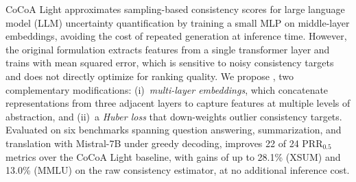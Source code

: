 CoCoA Light approximates sampling-based consistency scores for large language model
(LLM) uncertainty quantification by training a small MLP on middle-layer embeddings,
avoiding the cost of repeated generation at inference time.
However, the original formulation extracts features from a single transformer layer
and trains with mean squared error, which is sensitive to noisy consistency targets
and does not directly optimize for ranking quality.
We propose \method{}, two complementary modifications: (i)~\emph{multi-layer
embeddings}, which concatenate representations from three adjacent layers to
capture features at multiple levels of abstraction, and (ii)~a \emph{Huber loss}
that down-weights outlier consistency targets.
Evaluated on six benchmarks spanning question answering, summarization, and
translation with Mistral-7B under greedy decoding, \method{} improves 22 of 24
PRR$_{0.5}$ metrics over the CoCoA Light baseline, with gains of up to 28.1\%
(XSUM) and 13.0\% (MMLU) on the raw consistency estimator, at no additional
inference cost.
